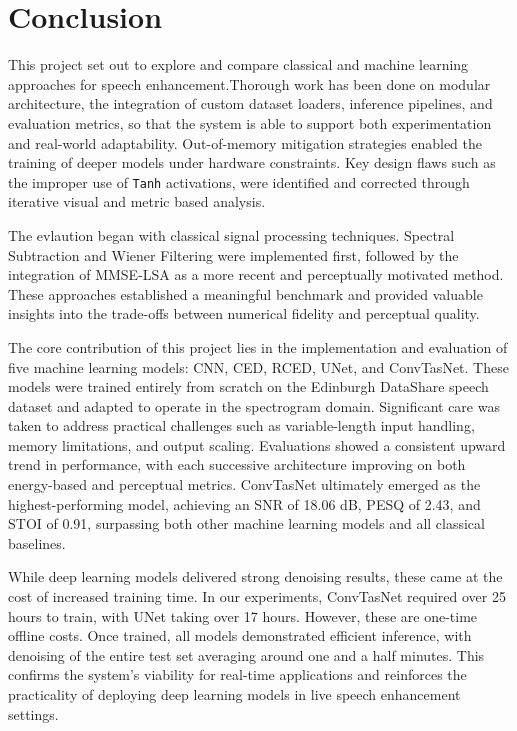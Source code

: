 \chapter{Conclusion}
\label{chap:conclusion}

This project set out to explore and compare classical and machine learning approaches for speech enhancement.Thorough work has been done on modular architecture, the integration of custom dataset loaders, inference pipelines, and evaluation metrics, so that the system is able to support both experimentation and real-world adaptability. Out-of-memory mitigation strategies enabled the training of deeper models under hardware constraints. Key design flaws such as the improper use of \texttt{Tanh} activations, were identified and corrected through iterative visual and metric based analysis.

The evlaution began with classical signal processing techniques. Spectral Subtraction and Wiener Filtering were implemented first, followed by the integration of MMSE-LSA as a more recent and perceptually motivated method. These approaches established a meaningful benchmark and provided valuable insights into the trade-offs between numerical fidelity and perceptual quality.

The core contribution of this project lies in the implementation and evaluation of five machine learning models: CNN, CED, RCED, UNet, and ConvTasNet. These models were trained entirely from scratch on the Edinburgh DataShare speech dataset and adapted to operate in the spectrogram domain. Significant care was taken to address practical challenges such as variable-length input handling, memory limitations, and output scaling. Evaluations showed a consistent upward trend in performance, with each successive architecture improving on both energy-based and perceptual metrics. ConvTasNet ultimately emerged as the highest-performing model, achieving an SNR of 18.06 dB, PESQ of 2.43, and STOI of 0.91, surpassing both other machine learning models and all classical baselines.

While deep learning models delivered strong denoising results, these came at the cost of increased training time. In our experiments, ConvTasNet required over 25 hours to train, with UNet taking over 17 hours. However, these are one-time offline costs. Once trained, all models demonstrated efficient inference, with denoising of the entire test set averaging around one and a half minutes. This confirms the system’s viability for real-time applications and reinforces the practicality of deploying deep learning models in live speech enhancement settings.

